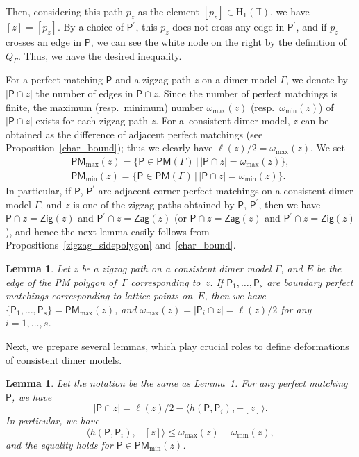 \documentclass[11pt]{article}
\numberwithin{equation}{section}
\numberwithin{equation}{section}
\numberwithin{figure}{section}
\numberwithin{table}{section}
\newtheorem{Lemma}[Theorem]{Lemma}
\newcommand{\TT}{\mathbb{T}}
\newcommand{\rmH}{\mathrm{H}}
\newcommand{\sfP}{\mathsf{P}}
\newcommand{\Zig}{\mathsf{Zig}}
\newcommand{\Zag}{\mathsf{Zag}}
\newcommand{\PM}{\mathsf{PM}}
\begin{document}
\begin{observation}[{cf.~\cite[Section~5.3]{IU2}}]
Then, considering this path $p_z$ as the element $[p_z]\in\rmH_1(\TT)$, we have $[z]=[p_z]$.
By a choice of $\sfP^\prime$, this $p_z$ does not cross any edge in $\sfP^\prime$, and if $p_z$ crosses an edge in $\sfP$, we can see the white node on the right by the definition of $Q_\Gamma$. Thus, we have the desired inequality.
\end{observation}

For a perfect matching $\sfP$ and a zigzag path $z$ on a dimer model $\Gamma$, we denote by $|\sfP\cap z|$ the number of edges in $\sfP\cap z$.
Since the number of perfect matchings is finite, the maximum (resp.\ minimum) number $\omega_{\max}(z)$ (resp.\ $\omega_{\min}(z)$) of $|\sfP\cap z|$ exists for each zigzag path $z$.
For a~consistent dimer model, $z$ can be obtained as the difference of adjacent perfect matchings (see Proposition~\ref{char_bound});
thus we clearly have $\ell(z)/2=\omega_{\max}(z)$.
We set
\begin{gather*}
\PM_{\max}(z)=\{\sfP\in\PM(\Gamma) \,|\, |\sfP\cap z|=\omega_{\max}(z)\},
\\
\PM_{\min}(z)=\{\sfP\in\PM(\Gamma) \,|\, |\sfP\cap z|=\omega_{\min}(z)\}.
\end{gather*}
In particular, if $\sfP$, $\sfP^\prime$ are adjacent corner perfect matchings on a consistent dimer model $\Gamma$, and $z$ is one of the zigzag paths obtained by $\sfP$, $\sfP^\prime$, then we have $\sfP\cap z=\Zig(z)$ and $\sfP^\prime\cap z=\Zag(z)$ (or $\sfP\cap z=\Zag(z)$ and $\sfP^\prime\cap z=\Zig(z)$),
and hence the next lemma easily follows from Propositions~\ref{zigzag_sidepolygon} and~\ref{char_bound}.

\begin{Lemma}\label{number_zigzag_corner}
Let $z$ be a zigzag path on a consistent dimer model $\Gamma$, and $E$ be the edge of the PM polygon of~$\Gamma$ corresponding to~$z$.
If $\sfP_1,\dots,\sfP_s$ are boundary perfect matchings corresponding to lattice points on~$E$, then we have
$\{\sfP_1,\dots,\sfP_s\}=\PM_{\max}(z)$, and $\omega_{\max}(z)=|\sfP_i\cap z|=\ell(z)/2$ for any $i=1,\dots,s$.
\end{Lemma}

Next, we prepare several lemmas, which play crucial roles to define deformations of consistent dimer models.

\begin{Lemma}\label{zigzag_lem1}
Let the notation be the same as Lemma~{\rm \ref{number_zigzag_corner}}.
For any perfect matching~$\sfP$, we have
\begin{displaymath}
|\sfP\cap z|=\ell(z)/2-\langle h(\sfP,\sfP_i),-[z]\rangle.
\end{displaymath}
In particular, we have
\begin{displaymath}
\langle h(\sfP,\sfP_i),-[z]\rangle\le \omega_{\max}(z)-\omega_{\min}(z),
\end{displaymath}
and the equality holds for $\sfP\in \PM_{\min}(z)$.
\end{Lemma}
\end{document}
